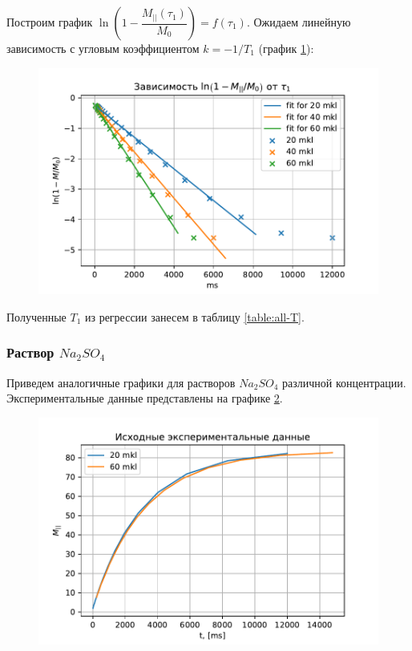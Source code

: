 Построим график $ \ln \left( 1 - \dfrac{M_{||} (\tau_1)}{M_0} \right) = f(\tau_1)$. Ожидаем линейную зависимость с угловым коэффициентом $ k = -1/T_1 $ (график \ref{fig:mnt1reg}):

\begin{figure}[h]
	\hspace{-5em}
	\includegraphics[width=1.2\linewidth]{data/Mn_T_1_reg}
	\caption{}
	\label{fig:mnt1reg}
\end{figure}

Полученные $ T_1 $ из регрессии занесем в таблицу \ref{table:all-T}.

\subsubsection{Раствор $Na_2 SO_4$}
Приведем аналогичные графики для растворов $ Na_2 SO_4 $ различной концентрации. Экспериментальные данные представлены на графике \ref{fig:nat1exp}.

\begin{figure}[h]
	\hspace{-5em}
	\includegraphics[width=1.2\linewidth]{data/Na_T_1_exp}
	\caption{}
	\label{fig:nat1exp}
\end{figure}

